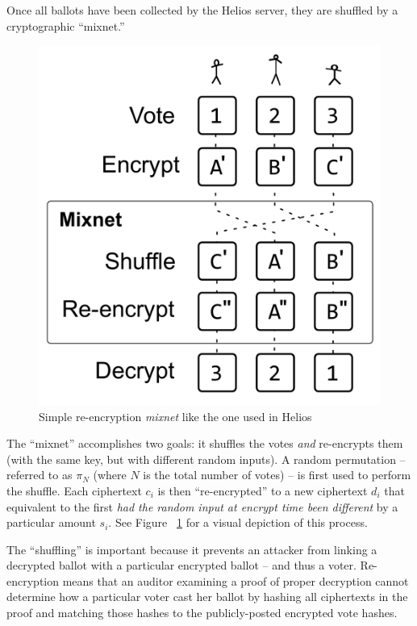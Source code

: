 \documentclass[10pt,twocolumn]{article}
\newcommand{\term}[1]{\textit{#1}}
\begin{document}
Once all ballots have been collected by the Helios server, they are shuffled by a cryptographic
``mixnet.''

\begin{figure}
	\center
	\includegraphics[width=0.8\columnwidth]{images/include/mixnet.pdf}
	\caption{Simple re-encryption \term{mixnet} like the one used in Helios}
	\label{fig:mixnet}
\end{figure}

The ``mixnet'' accomplishes two goals: it shuffles the votes \emph{and} re-encrypts them (with the
same key, but with different random inputs). A random permutation -- referred to as $\pi_{N}$ (where
$N$ is the total number of votes) -- is first used to perform the shuffle. Each ciphertext
$c_{i}$ is then ``re-encrypted'' to a new ciphertext $d_{i}$ that equivalent to the first \emph{had
the random input at encrypt time been different} by a particular amount $s_{i}$. See Figure
~\ref{fig:mixnet} for a visual depiction of this process.

The ``shuffling'' is important because it prevents an attacker from linking a decrypted ballot with
a particular encrypted ballot -- and thus a voter. Re-encryption means that an auditor examining a
proof of proper decryption cannot determine how a particular voter cast her ballot by hashing
all ciphertexts in the proof and matching those hashes to the publicly-posted encrypted vote hashes.
\end{document}
